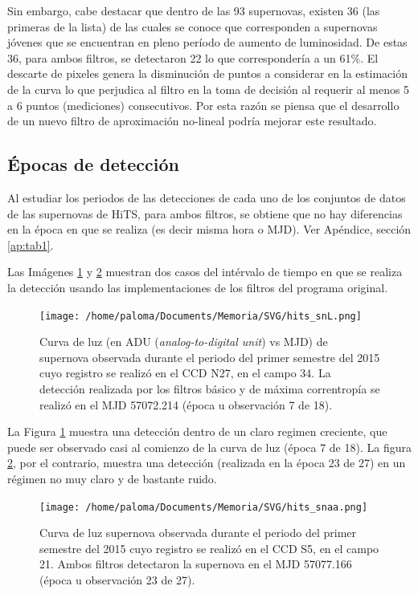 Sin embargo, cabe destacar que dentro de las 93 supernovas, existen 36 (las primeras de la lista) de las cuales se conoce que corresponden a supernovas j\'ovenes que se encuentran en pleno per\'iodo de aumento de luminosidad. De estas 36, para ambos filtros, se detectaron 22 lo que corresponder\'ia a un 61\%. El descarte de pixeles genera la disminuci\'on de puntos a considerar en la estimaci\'on de la curva lo que perjudica al filtro en la toma de decisi\'on al requerir al menos 5 a 6 puntos (mediciones) consecutivos. Por esta raz\'on se piensa que el desarrollo de un nuevo filtro de aproximaci\'on no-lineal podr\'ia mejorar este resultado.
\bigskip

\subsection{\'Epocas de detecci\'on}

Al estudiar los periodos de las detecciones de cada uno de los conjuntos de datos de las supernovas de HiTS, para ambos filtros, se obtiene que no hay diferencias en la \'epoca en que se realiza (es decir misma hora o MJD). Ver Ap\'endice, secci\'on \ref{ap:tab1}. 
\bigskip

Las Im\'agenes \ref{fig:orig_det_snL} y \ref{fig:orig_det_snaa} muestran dos casos del int\'ervalo de tiempo en que se realiza la detecci\'on usando las implementaciones de los filtros del programa original.
\bigskip

\begin{figure}[h!]
\centering
\texttt{[image: /home/paloma/Documents/Memoria/SVG/hits\_snL.png]}
\caption{Curva de luz (en ADU (\textit{analog-to-digital unit}) vs MJD) de supernova  observada durante el periodo del primer semestre del 2015 cuyo registro se realiz\'o en el CCD N27, en el campo 34. La detecci\'on realizada por los filtros b\'asico y de m\'axima correntrop\'ia se realiz\'o en el MJD 57072.214 (\'epoca u observaci\'on 7 de 18). }
\label{fig:orig_det_snL}
\end{figure}

La Figura \ref{fig:orig_det_snL} muestra una detecci\'on dentro de un claro regimen creciente, que puede ser observado casi al comienzo de la curva de luz (\'epoca 7 de 18). La figura \ref{fig:orig_det_snaa}, por el contrario, muestra una detecci\'on (realizada en la \'epoca 23 de 27) en un r\'egimen no muy claro y de bastante ruido.


\begin{figure}[h!]
\centering
\texttt{[image: /home/paloma/Documents/Memoria/SVG/hits\_snaa.png]}
\caption{Curva de luz supernova observada durante el periodo del primer semestre del 2015 cuyo registro se realiz\'o en el CCD S5, en el campo 21. Ambos filtros detectaron la supernova en el MJD 57077.166 (\'epoca u observaci\'on 23 de 27).}
\label{fig:orig_det_snaa}
\end{figure}
\bigskip

